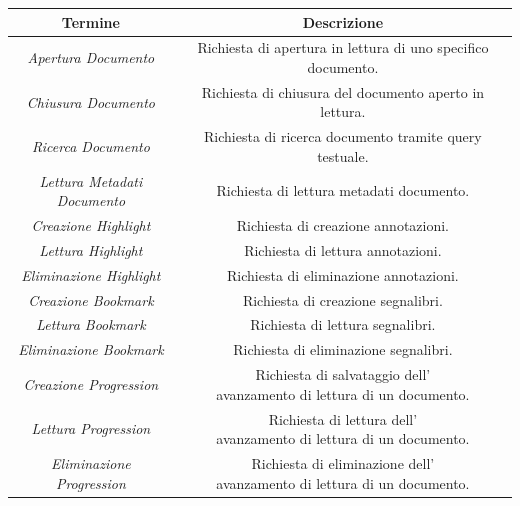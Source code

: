 \newpage
\begin{longtable}{|c|c|}
         \hline
         \textbf{Termine} & \textbf{Descrizione}\\
         \hline
         \textit{Apertura Documento} & \specialcell{Richiesta di apertura in lettura di uno specifico\\ documento.}\\
         \hline
         \textit{Chiusura Documento} & Richiesta di chiusura del documento aperto in lettura.\\
         \hline
         \textit{Ricerca Documento} & Richiesta di ricerca documento tramite query testuale.\\
         \hline
         \specialcell{\textit{Lettura Metadati}\\\textit{Documento}} & Richiesta di lettura metadati documento.\\
         \hline
         \textit{Creazione Highlight} & Richiesta di creazione annotazioni.\\
         \hline
         \textit{Lettura Highlight} & Richiesta di lettura annotazioni.\\
         \hline
         \textit{Eliminazione Highlight} & Richiesta di eliminazione annotazioni.\\
         \hline
         \textit{Creazione Bookmark} & Richiesta di creazione segnalibri.\\
         \hline
         \textit{Lettura Bookmark} & Richiesta di lettura segnalibri.\\
         \hline
         \textit{Eliminazione Bookmark} & Richiesta di eliminazione segnalibri.\\
         \hline
         \textit{Creazione Progression} & \specialcell{Richiesta di salvataggio dell'\\avanzamento di lettura di un documento.}\\
         \hline
         \textit{Lettura Progression} &  \specialcell{Richiesta di lettura dell'\\avanzamento di lettura di un documento.}\\
         \hline
         \textit{Eliminazione Progression} &  \specialcell{Richiesta di eliminazione dell'\\avanzamento di lettura di un documento.}\\

\end{longtable}
